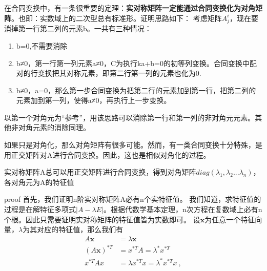 在合同变换中，有一条很重要的定理：\textbf{实对称矩阵一定能通过合同变换化为对角矩阵}。也即：实数域上的二次型总有标准形。证明思路如下：
考虑矩阵$A^i_j$，现在要消掉第一行第二列的元素b。一共有三种情况：
\begin{enumerate}
\item b=0,不需要消除
\item b≠0，第一行第一列元素a≠0，C为执行ka+b=0的初等列变换。合同变换中配对的行变换把其对称元素，即第二行第一列的元素也化为0.
\item b≠0，a=0，那么第一步合同变换为把第二行的元素加到第一行，把第二列的元素加到第一列，使得a≠0，再执行上一步变换。
\end{enumerate}
以第一个对角元为“参考”，用该思路可以消除第一行和第一列的非对角元元素。其他非对角元素的消除同理。

如果只是对角化，那么对角矩阵有很多可能。然而，有一类合同变换十分特殊，是用正交矩阵对A进行合同变换。因此，这也是相似对角化的过程。
\begin{theorem}{}
实对称矩阵A总可以用正交矩阵进行合同变换，得到对角矩阵$diag(\lambda_1,\lambda_2...\lambda_n)$，各对角元为A的特征值
\end{theorem}  

proof
首先，我们证明n阶实对称矩阵A必有n个实特征值。
我们知道，求特征值的过程是在解特征多项式$|A-\lambda E|$。根据代数学基本定理，n次方程在复数域上必有n个根。因此只需要证明实对称矩阵的特征值皆为实数即可。
设$\boldsymbol x$为任意一个特征向量，$\lambda$为其对应的特征值，那么我们有
\begin{equation}
\begin{aligned}
A\boldsymbol x&=\lambda \boldsymbol x\\
(A\boldsymbol x)^{*T}&=x^{*T}A=\lambda^{*}x^{*T}\\
x^{*T}Ax&=\lambda x^{*T}x=\lambda^{*}x^{*T}x~,
\end{aligned}
\end{equation}
